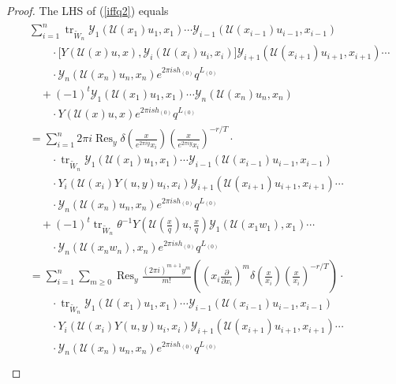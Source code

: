 \documentclass[9pt]{amsart}
\newcommand{\Y}{\mathcal{Y}}
\begin{document}
\begin{proof}
The LHS of (\ref{iffq2}) equals
\begin{align}\label{iffq3}
\begin{split}
&\sum_{i=1}^{n} \operatorname{tr}_{\tilde{W}_n}
\Y_1(\mathcal{U}(x_{1})u_{1},x_{1}) \cdots \Y_{i-1}(\mathcal{U}(x_{i-1})u_{i-1},x_{i-1}) \\
&\qquad \cdot \big[Y(\mathcal{U}(x)u,x),\Y_i(\mathcal{U}(x_{i})u_{i},x_{i})\big]
\Y_{i+1}(\mathcal{U}(x_{i+1})u_{i+1},x_{i+1}) \cdots \\
&\qquad \cdot \Y_n(\mathcal{U}(x_{n})u_{n},x_{n}) e^{2\pi i s h_{(0)}} q^{L_{(0)}} \\
&\quad + (-1)^{t}
\Y_1(\mathcal{U}(x_{1})u_{1},x_{1}) \cdots \Y_n(\mathcal{U}(x_{n})u_{n},x_{n}) \\
&\qquad \cdot Y(\mathcal{U}(x)u,x) e^{2\pi i s h_{(0)}} q^{L_{(0)}} \\
&=\sum_{i=1}^{n} 2\pi i \operatorname{Res}_{y}
\delta\left(\frac{x}{e^{2\pi i y} x_i}\right)
\left(\frac{x}{e^{2\pi i y} x_i}\right)^{-r/T} \cdot \\
&\qquad \cdot \operatorname{tr}_{\tilde{W}_n}
\Y_1(\mathcal{U}(x_{1})u_{1},x_{1}) \cdots
\Y_{i-1}(\mathcal{U}(x_{i-1})u_{i-1},x_{i-1}) \\
&\qquad \cdot Y_i\left(\mathcal{U}(x_i) Y(u,y) u_i, x_i \right)
\Y_{i+1}(\mathcal{U}(x_{i+1})u_{i+1},x_{i+1}) \cdots \\
&\qquad \cdot \Y_n(\mathcal{U}(x_{n})u_{n},x_{n})
e^{2\pi i s h_{(0)}} q^{L_{(0)}} \\
&\quad + (-1)^{t}
\operatorname{tr}_{\tilde{W}_n} \theta^{-1} Y\left(\mathcal{U}\left(\frac{x}{q}\right) u, \frac{x}{q} \right)
\mathcal{Y}_1(\mathcal{U}(x_1 w_1),x_1) \cdots \\
&\qquad \cdot \mathcal{Y}_n(\mathcal{U}(x_n w_n),x_n)
e^{2\pi i s h_{(0)}} q^{L_{(0)}} \\
&=\sum_{i=1}^{n} \sum_{m \geq 0}
\operatorname{Res}_{y} \frac{(2\pi i)^{m+1} y^m}{m!}
\left( \left( x_i \frac{\partial}{\partial x_i} \right)^m
\delta\left( \frac{x}{x_i} \right)
\left( \frac{x}{x_i} \right)^{-r/T} \right) \cdot \\
&\qquad \cdot \operatorname{tr}_{\tilde{W}_n}
\Y_1(\mathcal{U}(x_{1})u_{1},x_{1}) \cdots
\Y_{i-1}(\mathcal{U}(x_{i-1})u_{i-1},x_{i-1}) \\
&\qquad \cdot Y_i(\mathcal{U}(x_i) Y(u,y) u_i, x_i)
\Y_{i+1}(\mathcal{U}(x_{i+1})u_{i+1},x_{i+1}) \cdots \\
&\qquad \cdot \Y_n(\mathcal{U}(x_{n})u_{n},x_{n})
e^{2\pi i s h_{(0)}} q^{L_{(0)}} \\

\end{split}
\end{align}
\end{proof}
\end{document}
